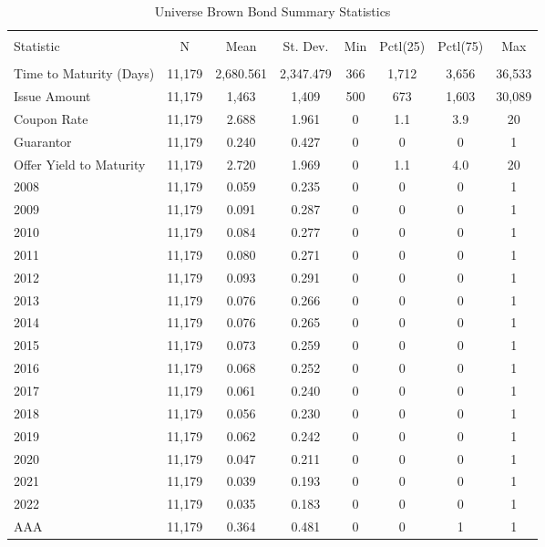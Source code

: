\begin{table}[!htbp] \centering 
  \caption{Universe Brown Bond Summary Statistics} 
  \label{} 
  \footnotesize
\begin{tabular}{@{\extracolsep{5pt}}lccccccc} 
\\[-1.8ex]\hline 
\hline \\[-1.8ex] 
Statistic & \multicolumn{1}{c}{N} & \multicolumn{1}{c}{Mean} & \multicolumn{1}{c}{St. Dev.} & \multicolumn{1}{c}{Min} & \multicolumn{1}{c}{Pctl(25)} & \multicolumn{1}{c}{Pctl(75)} & \multicolumn{1}{c}{Max} \\ 
\hline \\[-1.8ex] 
Time to Maturity (Days) & 11,179 & 2,680.561 & 2,347.479 & 366 & 1,712 & 3,656 & 36,533 \\ 
Issue Amount & 11,179 & 1,463 & 1,409 & 500 & 673 & 1,603 & 30,089 \\ 
Coupon Rate & 11,179 & 2.688 & 1.961 & 0 & 1.1 & 3.9 & 20 \\ 
Guarantor & 11,179 & 0.240 & 0.427 & 0 & 0 & 0 & 1 \\ 
Offer Yield to Maturity & 11,179 & 2.720 & 1.969 & 0 & 1.1 & 4.0 & 20 \\ 
2008 & 11,179 & 0.059 & 0.235 & 0 & 0 & 0 & 1 \\ 
2009 & 11,179 & 0.091 & 0.287 & 0 & 0 & 0 & 1 \\ 
2010 & 11,179 & 0.084 & 0.277 & 0 & 0 & 0 & 1 \\ 
2011 & 11,179 & 0.080 & 0.271 & 0 & 0 & 0 & 1 \\ 
2012 & 11,179 & 0.093 & 0.291 & 0 & 0 & 0 & 1 \\ 
2013 & 11,179 & 0.076 & 0.266 & 0 & 0 & 0 & 1 \\ 
2014 & 11,179 & 0.076 & 0.265 & 0 & 0 & 0 & 1 \\ 
2015 & 11,179 & 0.073 & 0.259 & 0 & 0 & 0 & 1 \\ 
2016 & 11,179 & 0.068 & 0.252 & 0 & 0 & 0 & 1 \\ 
2017 & 11,179 & 0.061 & 0.240 & 0 & 0 & 0 & 1 \\ 
2018 & 11,179 & 0.056 & 0.230 & 0 & 0 & 0 & 1 \\ 
2019 & 11,179 & 0.062 & 0.242 & 0 & 0 & 0 & 1 \\ 
2020 & 11,179 & 0.047 & 0.211 & 0 & 0 & 0 & 1 \\ 
2021 & 11,179 & 0.039 & 0.193 & 0 & 0 & 0 & 1 \\ 
2022 & 11,179 & 0.035 & 0.183 & 0 & 0 & 0 & 1 \\ 
AAA & 11,179 & 0.364 & 0.481 & 0 & 0 & 1 & 1 \\ 

\end{tabular}
\end{table}
